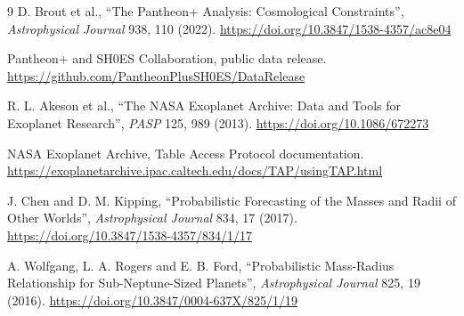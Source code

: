 \documentclass[10pt,twocolumn]{article}
\begin{document}
\begin{thebibliography}{9}
D. Brout et al., ``The Pantheon+ Analysis: Cosmological Constraints'',
\emph{Astrophysical Journal} 938, 110 (2022).
\url{https://doi.org/10.3847/1538-4357/ac8e04}

Pantheon+ and SH0ES Collaboration, public data release.
\url{https://github.com/PantheonPlusSH0ES/DataRelease}

R. L. Akeson et al., ``The NASA Exoplanet Archive: Data and Tools for
Exoplanet Research'', \emph{PASP} 125, 989 (2013).
\url{https://doi.org/10.1086/672273}

NASA Exoplanet Archive, Table Access Protocol documentation.
\url{https://exoplanetarchive.ipac.caltech.edu/docs/TAP/usingTAP.html}

J. Chen and D. M. Kipping, ``Probabilistic Forecasting of the Masses and
Radii of Other Worlds'', \emph{Astrophysical Journal} 834, 17 (2017).
\url{https://doi.org/10.3847/1538-4357/834/1/17}

A. Wolfgang, L. A. Rogers and E. B. Ford, ``Probabilistic Mass-Radius
Relationship for Sub-Neptune-Sized Planets'', \emph{Astrophysical Journal}
825, 19 (2016). \url{https://doi.org/10.3847/0004-637X/825/1/19}
\end{thebibliography}
\end{document}
